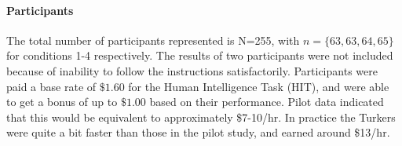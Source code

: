     \paragraph{Participants}
    The total number of participants represented is N=255, with $n=\{63,63,64,65\}$ for conditions 1-4 respectively. The results of two participants were not included because of inability to follow the instructions satisfactorily. Participants were paid a base rate of $\$1.60$ for the Human Intelligence Task (HIT), and were able to get a bonus of up to $\$1.00$ based on their performance. Pilot data indicated that this would be equivalent to approximately \$7-10/hr. In practice the Turkers were quite a bit faster than those in the pilot study, and earned around \$13/hr.
